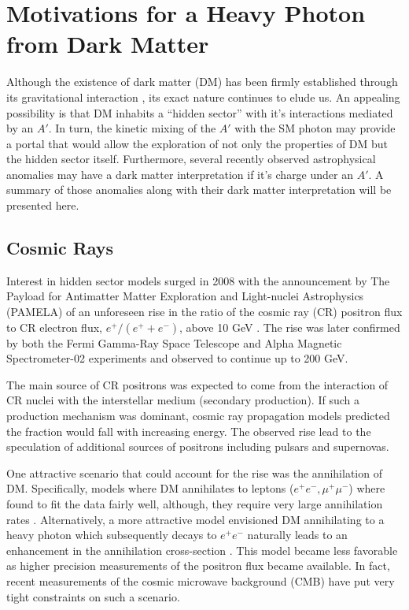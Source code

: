 %
%

\section{Motivations for a Heavy Photon from Dark Matter}

Although the existence of dark matter (DM) has been firmly established through its
gravitational interaction \cite{popolo2014}, its exact nature continues to elude
us. An appealing
possibility is that DM inhabits a ``hidden sector'' with it's interactions 
mediated by an $A'$.  In turn, the kinetic mixing of the $A'$ with the SM 
photon may provide a portal that would allow the exploration of not only the 
properties of DM but the hidden sector itself.  Furthermore, several recently
observed astrophysical anomalies \cite{pamela2008, ackermann2012, aguilar2013}
may have a dark matter interpretation if it's
charge under an $A'$.  A summary of those anomalies along with their dark matter
interpretation will be presented here.

\subsection{Cosmic Rays}

Interest in hidden sector models surged in 2008 with the announcement by 
The Payload for Antimatter Matter Exploration and Light-nuclei Astrophysics \\ 
(PAMELA) of an unforeseen rise in the ratio of the cosmic ray (CR) positron flux
to CR electron flux, $e^{+}/(e^{+} + e^{-})$, above 10 GeV \cite{pamela2008}.
The rise was later confirmed by both the 
Fermi Gamma-Ray Space Telescope \cite{ackermann2012} and Alpha Magnetic 
Spectrometer-02 \cite{aguilar2013} experiments and observed to continue
up to 200 GeV. 

The main source of CR positrons 
was expected to come from the interaction of CR nuclei with the interstellar 
medium (secondary production).  If such a production mechanism was dominant, 
cosmic ray propagation models predicted the fraction would fall with increasing
energy.  The observed rise lead to the speculation of additional sources of 
positrons including pulsars\cite{} and supernovas\cite{}.

One attractive scenario that could account for the rise was the annihilation of
DM.  Specifically, models where DM annihilates to leptons ($e^+e^-, \mu^+\mu^-$)
where found to fit the data fairly well, although, they
require very large annihilation rates \cite{cholis2009}. Alternatively, a 
more attractive model envisioned DM annihilating to a heavy photon which 
subsequently decays to 
$e^+e^-$ naturally leads to an enhancement in the annihilation cross-section
\cite{arkani-hamed2009}.  This model became less favorable as higher
precision measurements of the positron flux became available.  In fact, 
recent measurements of the cosmic microwave background (CMB) have put very 
tight constraints on such a scenario.

